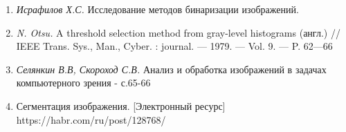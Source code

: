 \documentclass[a4paper,12pt]{article}
\begin{document}
\begin{enumerate}
    \item \textit{Исрафилов Х.С.} Исследование методов бинаризации изображений.
    \item \textit{N. Otsu.} A threshold selection method from gray-level histograms (англ.) // IEEE Trans. Sys., Man., Cyber. : journal. — 1979. — Vol. 9. — P. 62—66
    \item \textit{Селянкин В.В, Скороход С.В.} Анализ и обработка изображений в задачах компьютерного зрения - с.65-66
    \item Сегментация изображения. [Электронный ресурс] https://habr.com/ru/post/128768/
\end{enumerate}
\end{document}
